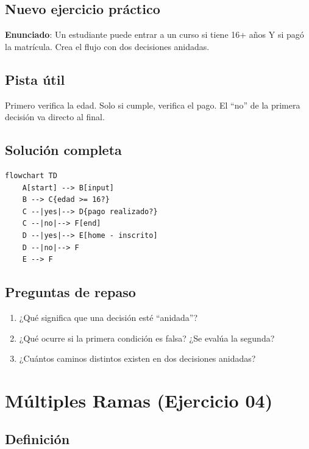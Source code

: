 \documentclass[12pt]{article}
\begin{document}
\subsection{Nuevo ejercicio práctico}

\textbf{Enunciado}: Un estudiante puede entrar a un curso si tiene 16+ años Y si pagó la matrícula. Crea el flujo con dos decisiones anidadas.

\subsection{Pista útil}

Primero verifica la edad. Solo si cumple, verifica el pago. El ``no'' de la primera decisión va directo al final.

\subsection{Solución completa}

\begin{lstlisting}[style=mermaidstyle]
flowchart TD
    A[start] --> B[input]
    B --> C{edad >= 16?}
    C --|yes|--> D{pago realizado?}
    C --|no|--> F[end]
    D --|yes|--> E[home - inscrito]
    D --|no|--> F
    E --> F
\end{lstlisting}

\subsection{Preguntas de repaso}

\begin{enumerate}
    \item ¿Qué significa que una decisión esté ``anidada''?
    \item ¿Qué ocurre si la primera condición es falsa? ¿Se evalúa la segunda?
    \item ¿Cuántos caminos distintos existen en dos decisiones anidadas?
\end{enumerate}

\newpage

\section{Múltiples Ramas (Ejercicio 04)}

\subsection{Definición}
\end{document}
